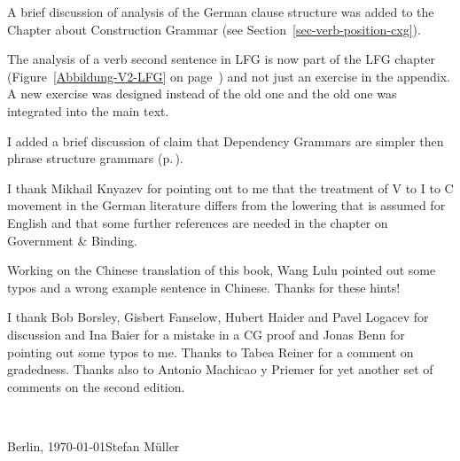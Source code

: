 A brief discussion of  analysis of the German clause structure was added to the
Chapter about Construction Grammar (see Section~\ref{sec-verb-position-cxg}).

The analysis of a verb second sentence in LFG is now part of the LFG chapter
(Figure~\ref{Abbildung-V2-LFG} on page~\pageref{Abbildung-V2-LFG}) and not just an
exercise in the appendix. A new exercise was designed instead of the old one and the old one was
integrated into the main text.

I added a brief discussion of  claim that Dependency Grammars are simpler then
phrase structure grammars (p.\,\pageref{page-simplicity-dg}).


I thank Mikhail Knyazev for pointing out to me that the treatment of V to I to C movement in the
German literature differs from the lowering that is assumed for English and that some further
references are needed in the chapter on Government \& Binding. 

Working on the Chinese translation of this book, Wang Lulu pointed out some
typos and a wrong example sentence in Chinese. Thanks for these hints! 

I thank Bob Borsley, Gisbert Fanselow, Hubert Haider and Pavel Logacev for discussion and Ina Baier for a mistake
in a CG proof and Jonas Benn for pointing out some typos to me. Thanks to Tabea Reiner for a comment
on gradedness. Thanks also to Antonio Machicao y Priemer for yet another set of comments on the
second edition.

~\medskip

\noindent
Berlin, \today\hfill Stefan Müller



